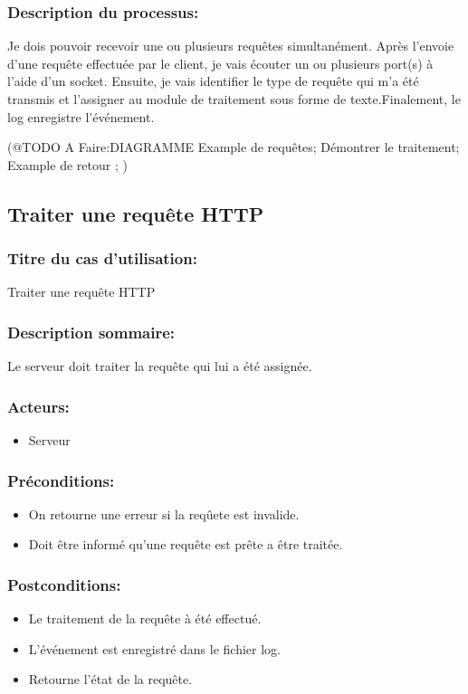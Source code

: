 \documentclass{scrreprt}
\begin{document}
\subsubsection{Description du processus:}
Je dois pouvoir recevoir une ou plusieurs requêtes simultanément. Après l'envoie d'une requête effectuée par le client, je vais écouter un ou plusieurs port(s) à l'aide d'un socket. Ensuite, je vais identifier le type de requête qui m'a été transmis et l'assigner au module de traitement sous forme de texte.Finalement, le log enregistre l'événement.


(@TODO A Faire:DIAGRAMME
Example de requêtes;
Démontrer le traitement;
Example de retour ;
)


\subsection{Traiter une requête HTTP}
\subsubsection{Titre du cas d'utilisation:} Traiter une requête HTTP
\subsubsection{Description sommaire:} Le serveur doit traiter la requête qui lui a été assignée.
\subsubsection{Acteurs:}
\begin{itemize}
    \item Serveur
\end{itemize}
\subsubsection{Préconditions:}
\begin{itemize}
    \item On retourne une erreur si la reqûete est invalide.
    \item Doit être informé qu'une requête est prête a être traitée.  
\end{itemize} 
\subsubsection{Postconditions:}
\begin{itemize}
    \item Le traitement de la requête à été effectué.
    \item L'événement est enregistré dans le fichier log. 
    \item Retourne l'état de la requête.    
\end{itemize} 
\end{document}
